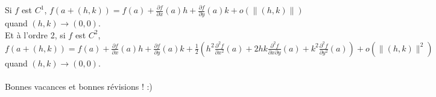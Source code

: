 \documentclass{article}
\begin{document}
Si $f$ est $C^1$, $ f(a+(h,k)) = f(a) + \frac{\partial f}{\partial x}(a) h + \frac{\partial f}{\partial y}(a) k + o(\|(h,k)\|)$ quand $(h,k) \to (0,0)$.\\
Et à l'ordre 2, si $f$ est $C^2$,\\
$f(a+(h,k)) = f(a) + \frac{\partial f}{\partial x}(a) h + \frac{\partial f}{\partial y}(a) k + \frac{1}{2} (h^2 \frac{\partial^2 f}{\partial x^2}(a) + 2hk \frac{\partial^2 f}{\partial x \partial y}(a) + k^2 \frac{\partial^2 f}{\partial y^2}(a)) + o(\|(h,k)\|^2)$ quand $(h,k) \to (0,0)$.\\\\

Bonnes vacances et bonnes révisions ! :)
\newpage
\tableofcontents
\end{document}

